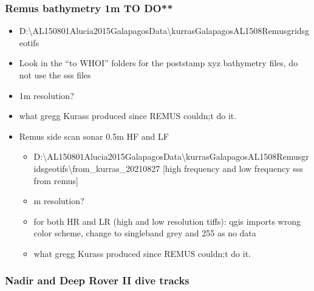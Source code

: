 \documentclass[letterpaper,10pt,english]{sphinxmanual}
\begin{document}
\subsubsection{Remus bathymetry \sphinxhyphen{} 1m \sphinxhyphen{} TO DO**}
\label{\detokenize{02_folder_hierarchy:remus-bathymetry-1m-to-do}}\begin{itemize}
\item {} 
\sphinxAtStartPar
D:\textbackslash{}AL150801\sphinxhyphen{}Alucia\sphinxhyphen{}2015\sphinxhyphen{}Galapagos\sphinxhyphen{}Data\textbackslash{}kurras\sphinxhyphen{}Galapagos\sphinxhyphen{}AL1508\sphinxhyphen{}Remus\sphinxhyphen{}grids\sphinxhyphen{}geotifs

\item {} 
\sphinxAtStartPar
Look in the “to WHOI” folders for the poststamp xyz bathymetry files, do not use the sss files

\item {} 
\sphinxAtStartPar
1m resolution?

\item {} 
\sphinxAtStartPar
what gregg Kurass produced since REMUS couldn;t do it.

\item {} 
\sphinxAtStartPar
Remus side scan sonar \sphinxhyphen{} 0.5m \sphinxhyphen{} HF and LF
\begin{itemize}
\item {} 
\sphinxAtStartPar
D:\textbackslash{}AL150801\sphinxhyphen{}Alucia\sphinxhyphen{}2015\sphinxhyphen{}Galapagos\sphinxhyphen{}Data\textbackslash{}kurras\sphinxhyphen{}Galapagos\sphinxhyphen{}AL1508\sphinxhyphen{}Remus\sphinxhyphen{}grids\sphinxhyphen{}geotifs\textbackslash{}from\_kurras\_20210827 {[}high frequency and low frequency sss from remus{]}

\item {} 
 m resolution?

\item {} 
\sphinxAtStartPar
for both HR and LR (high and low resolution tiffs): qgis imports wrong color scheme, change to singleband grey and 255 as no data

\item {} 
\sphinxAtStartPar
what gregg Kurass produced since REMUS couldn;t do it.

\end{itemize}

\end{itemize}


\subsubsection{Nadir and Deep Rover II dive tracks}
\label{\detokenize{02_folder_hierarchy:nadir-and-deep-rover-ii-dive-tracks}}
\end{document}
